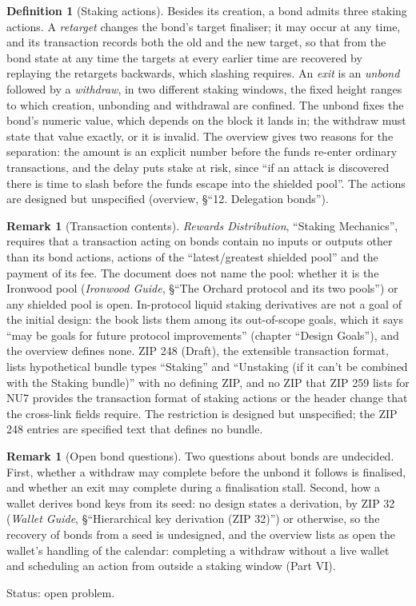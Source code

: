 \documentclass[11pt,a4paper]{article}
\theoremstyle{definition}
\newtheorem{definition}[theorem]{Definition}
\newtheorem{remark}[theorem]{Remark}
\begin{document}
\begin{definition}[Staking actions]\label{def:staking-actions}
Besides its creation, a bond admits three staking actions. A
\emph{retarget} changes the bond's target finaliser; it may occur at any
time, and its transaction records both the old and the new target, so that
from the bond state at any time the targets at every earlier time are
recovered by replaying the retargets backwards, which slashing requires. An
\emph{exit} is an \emph{unbond} followed by a \emph{withdraw}, in two
different staking windows, the fixed height ranges to which creation,
unbonding and withdrawal are confined. The unbond fixes the bond's numeric
value, which depends on the block it lands in; the withdraw must state that
value exactly, or it is invalid. The overview gives two reasons for the
separation: the amount is an explicit number before the funds re-enter
ordinary transactions, and the delay puts stake at risk, since ``if an
attack is discovered there is time to slash before the funds escape into the
shielded pool''. The actions are designed but unspecified (overview, \S``12.
Delegation bonds'').
\end{definition}

\begin{remark}[Transaction contents]\label{rem:bond-tx}
\emph{Rewards Distribution}, ``Staking Mechanics'', requires that a
transaction acting on bonds contain no inputs or outputs other than its bond
actions, actions of the ``latest/greatest shielded pool'' and the payment of
its fee. The document does not name the pool: whether it is the Ironwood
pool (\emph{Ironwood Guide}, \S``The Orchard protocol and its two
pools'') or any shielded pool is open. In-protocol liquid staking
derivatives are not a goal of the initial design: the book lists them among
its out-of-scope goals, which it says ``may be goals for future protocol
improvements'' (chapter ``Design Goals''), and the overview defines none.
ZIP 248 (Draft), the extensible transaction format, lists hypothetical bundle
types ``Staking'' and ``Unstaking (if it can't be combined with the Staking
bundle)'' with no defining ZIP, and no ZIP that ZIP 259 lists for NU7 provides
the transaction format of staking actions or the header change that the
cross-link fields require. The restriction is designed but unspecified; the
ZIP 248 entries are specified text that defines no bundle.
\end{remark}

\begin{remark}[Open bond questions]\label{rem:bond-open}
Two questions about bonds are undecided. First, whether a withdraw may
complete before the unbond it follows is finalised, and whether an exit may
complete during a finalisation stall. Second, how a wallet derives bond keys
from its seed: no design states a derivation, by ZIP 32 (\emph{Wallet
Guide}, \S``Hierarchical key derivation (ZIP 32)'') or otherwise, so
the recovery of bonds from a seed is undesigned, and the overview lists as
open the wallet's handling of the calendar: completing a withdraw without a
live wallet and scheduling an action from outside a staking window
(Part VI).

Status: open problem.
\end{remark}
\end{document}
